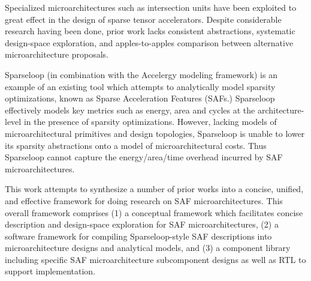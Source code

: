 % 
% 
%


Specialized microarchitectures such as intersection units have been exploited to great effect in the design of sparse tensor accelerators. Despite considerable research having been done, prior work lacks consistent abstractions, systematic design-space exploration, and apples-to-apples comparison between alternative microarchitecture proposals.

Sparseloop (in combination with the Accelergy modeling framework) is an example of an existing tool which attempts to analytically model sparsity optimizations, known as Sparse Acceleration Features (SAFs.) Sparseloop effectively models key metrics such as energy, area and cycles at the architecture-level in the presence of sparsity optimizations. However, lacking models of microarchitectural primitives and design topologies, Sparseloop is unable to lower its sparsity abstractions onto a model of microarchitectural costs. Thus Sparseloop cannot capture the energy/area/time overhead incurred by SAF microarchitectures.

This work attempts to synthesize a number of prior works into a concise, unified, and effective framework for doing research on SAF microarchitectures. This overall framework comprises (1) a conceptual framework which facilitates concise description and design-space exploration for SAF microarchitectures, (2) a software framework for compiling Sparseloop-style SAF descriptions into microarchitecture designs and analytical models, and (3) a component library including specific SAF microarchitecture subcomponent designs as well as RTL to support implementation. 